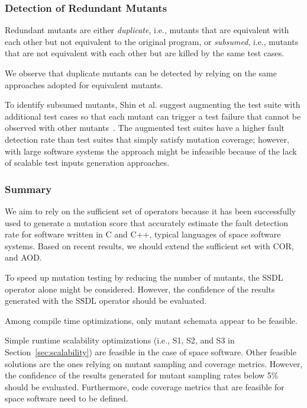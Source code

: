 \subsubsection{Detection of Redundant Mutants}

Redundant mutants are either \emph{duplicate}, i.e., mutants that are equivalent with each other but not equivalent to the original program, or \emph{subsumed}, i.e., mutants that are not equivalent with each other but are killed by the same test cases. 

We observe that duplicate mutants can be detected by relying on the same approaches adopted for equivalent mutants. 

To identify subsumed mutants, Shin et al. suggest augmenting the test suite with additional test cases so that each mutant can trigger a test failure that cannot be observed with other mutants~\cite{Shin:TSE:DCriterion:2018}. 
The augmented test suites have a higher
 fault detection rate than test suites that simply satisfy mutation coverage; however, with large software systems the approach might be infeasible because of the lack of scalable test inputs generation approaches.


\subsubsection{Summary}

We aim to rely on the sufficient set of operators because it has been successfully used to generate a mutation score that accurately estimate the fault detection rate for software written in C and C++, typical languages of space software systems.
Based on recent results, we should extend the sufficient set with COR, and AOD.

To speed up mutation testing by reducing the number of mutants, the SSDL operator alone might be considered. However, the confidence of the results generated with the SSDL operator should be evaluated.

Among compile time optimizations, only mutant schemata appear to be feasible.

Simple runtime scalability optimizations (i.e., S1, S2, and S3 in Section~\ref{sec:scalability}) are feasible in the case of space software. Other feasible solutions are the ones relying on mutant sampling and coverage metrics. However, the confidence of the results generated for mutant sampling rates below 5\% should be evaluated. Furthermore, code coverage metrics that are feasible for space software need to be defined.

